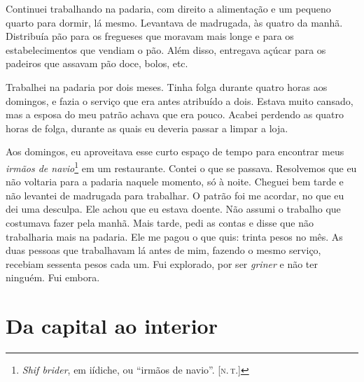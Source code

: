 Continuei trabalhando na padaria, com direito a
alimentação e um pequeno quarto para dormir, lá mesmo. Levantava de madrugada, às quatro
da manhã. Distribuía pão para os fregueses que moravam mais longe e para os
estabelecimentos que vendiam o pão. Além disso, entregava açúcar para os padeiros que assavam pão doce, bolos, etc.


Trabalhei na padaria por dois meses. Tinha folga durante quatro
horas aos domingos, e fazia o serviço que era antes atribuído a dois. Estava
muito cansado, mas a esposa do meu patrão achava que era pouco. Acabei perdendo
as quatro horas de folga, durante as quais eu deveria passar a limpar a loja. 

Aos domingos, eu aproveitava esse curto espaço de tempo para encontrar 
meus \textit{irmãos de navio}\footnote{\textit{Shif brider}, em iídiche, ou ``irmãos de navio''. [\textsc{n.\,t.}]} em um restaurante. Contei o que se passava. Resolvemos que eu não voltaria para a padaria naquele
momento, só à noite. Cheguei bem tarde e não levantei de madrugada para
trabalhar. O patrão foi me acordar, no que eu dei uma desculpa. Ele
achou que eu estava doente. Não assumi o trabalho que costumava fazer
pela manhã. Mais tarde, pedi as contas e disse que não trabalharia mais na
padaria. Ele me pagou o que quis: trinta pesos no mês. As duas pessoas que
trabalhavam lá antes de mim, fazendo o mesmo serviço, recebiam sessenta pesos cada um. Fui explorado, por ser \textit{griner} e não ter ninguém. Fui embora.

\chapter{Da capital ao interior}

